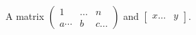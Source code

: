 \documentclass{article}
\begin{document}
A matrix $\begin{pmatrix} 1 & \dots & n \\ a\cdots & b & c\dots \end{pmatrix}$ and $\begin{bmatrix} x\dots & y \end{bmatrix}$.
\end{document}
